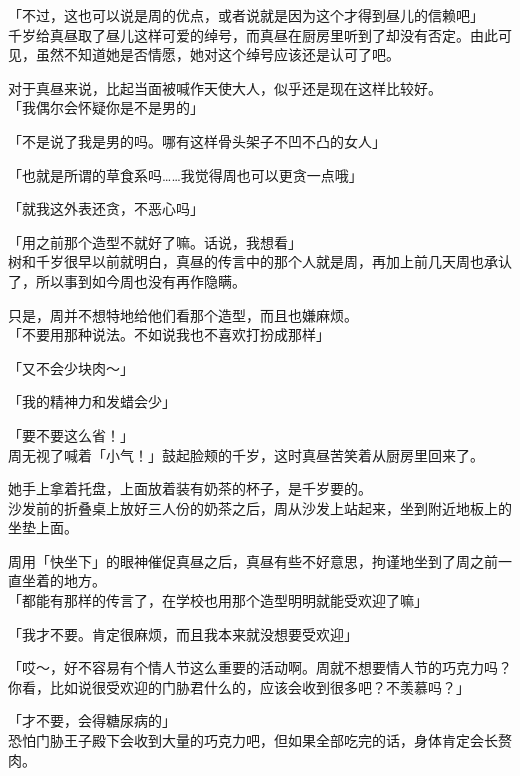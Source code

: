 「不过，这也可以说是周的优点，或者说就是因为这个才得到昼儿的信赖吧」\\

千岁给真昼取了昼儿这样可爱的绰号，而真昼在厨房里听到了却没有否定。由此可见，虽然不知道她是否情愿，她对这个绰号应该还是认可了吧。

对于真昼来说，比起当面被喊作天使大人，似乎还是现在这样比较好。\\

「我偶尔会怀疑你是不是男的」

「不是说了我是男的吗。哪有这样骨头架子不凹不凸的女人」

「也就是所谓的草食系吗……我觉得周也可以更贪一点哦」

「就我这外表还贪，不恶心吗」

「用之前那个造型不就好了嘛。话说，我想看」\\

树和千岁很早以前就明白，真昼的传言中的那个人就是周，再加上前几天周也承认了，所以事到如今周也没有再作隐瞒。

只是，周并不想特地给他们看那个造型，而且也嫌麻烦。\\

「不要用那种说法。不如说我也不喜欢打扮成那样」

「又不会少块肉～」

「我的精神力和发蜡会少」

「要不要这么省！」\\

周无视了喊着「小气！」鼓起脸颊的千岁，这时真昼苦笑着从厨房里回来了。

她手上拿着托盘，上面放着装有奶茶的杯子，是千岁要的。\\

沙发前的折叠桌上放好三人份的奶茶之后，周从沙发上站起来，坐到附近地板上的坐垫上面。

周用「快坐下」的眼神催促真昼之后，真昼有些不好意思，拘谨地坐到了周之前一直坐着的地方。\\

「都能有那样的传言了，在学校也用那个造型明明就能受欢迎了嘛」

「我才不要。肯定很麻烦，而且我本来就没想要受欢迎」

「哎～，好不容易有个情人节这么重要的活动啊。周就不想要情人节的巧克力吗？你看，比如说很受欢迎的门胁君什么的，应该会收到很多吧？不羡慕吗？」

「才不要，会得糖尿病的」\\

恐怕门胁王子殿下会收到大量的巧克力吧，但如果全部吃完的话，身体肯定会长赘肉。\\

